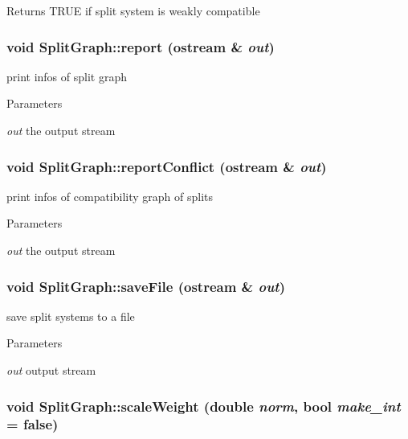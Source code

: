 \label{classSplitGraph_a05cfb8141526a6cbc5905eb74dccc0fa}
\begin{DoxyReturn}{Returns}
TRUE if split system is weakly compatible 
\end{DoxyReturn}
\hypertarget{classSplitGraph_abd01f1db37dbb2c97becef1b38032dd9}{
\subsubsection[{report}]{\setlength{\rightskip}{0pt plus 5cm}void SplitGraph::report (ostream \& {\em out})}}
\label{classSplitGraph_abd01f1db37dbb2c97becef1b38032dd9}
print infos of split graph 
\begin{DoxyParams}{Parameters}
\item[{\em out}]the output stream \end{DoxyParams}
\hypertarget{classSplitGraph_a1876d549d833982752e4ad2e263ec6d4}{
\subsubsection[{reportConflict}]{\setlength{\rightskip}{0pt plus 5cm}void SplitGraph::reportConflict (ostream \& {\em out})}}
\label{classSplitGraph_a1876d549d833982752e4ad2e263ec6d4}
print infos of compatibility graph of splits 
\begin{DoxyParams}{Parameters}
\item[{\em out}]the output stream \end{DoxyParams}
\hypertarget{classSplitGraph_ac00dacfe044abd770bb24b5714035742}{
\subsubsection[{saveFile}]{\setlength{\rightskip}{0pt plus 5cm}void SplitGraph::saveFile (ostream \& {\em out})}}
\label{classSplitGraph_ac00dacfe044abd770bb24b5714035742}
save split systems to a file 
\begin{DoxyParams}{Parameters}
\item[{\em out}]output stream \end{DoxyParams}
\hypertarget{classSplitGraph_aaa150a66ac97d6170336a9c74ffecc88}{
\subsubsection[{scaleWeight}]{\setlength{\rightskip}{0pt plus 5cm}void SplitGraph::scaleWeight (double {\em norm}, \/  bool {\em make\_\-int} = {\ttfamily false})}}
